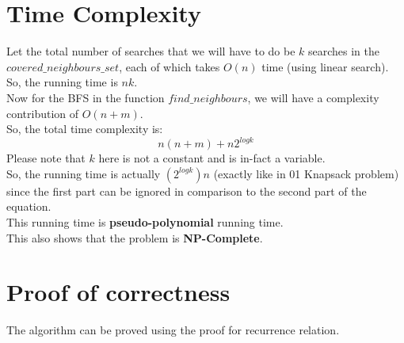 \documentclass[letterpaper, 11pt]{article}
\begin{document}
\section{Time Complexity}
\label{sec:complexity}
Let the total number of searches  that  we will have to do be  $k$ searches in the $covered\_neighbours\_set$, each of which takes  $O(n)$ time (using linear search). \\
So, the running time is $nk$.\\
Now for the BFS in the function $find\_neighbours$, we will have a complexity contribution of $O(n+m)$.\\
So, the total time complexity is:
\begin{equation*}
    n(n+m) + n2^{logk}
\end{equation*}
Please note that $k$ here is not a constant and is in-fact a variable.\\
So, the running time is actually $(2^{logk})n$ (exactly like in 01 Knapsack problem) since the first part can be ignored in comparison to the second part of the equation.\\

This running time is \textbf{pseudo-polynomial} running time.\\
This also shows that the problem is \textbf{NP-Complete}.\\

\section{Proof of correctness}
\label{sec:proof}
The algorithm can be proved using the proof for recurrence relation.
\end{document}
